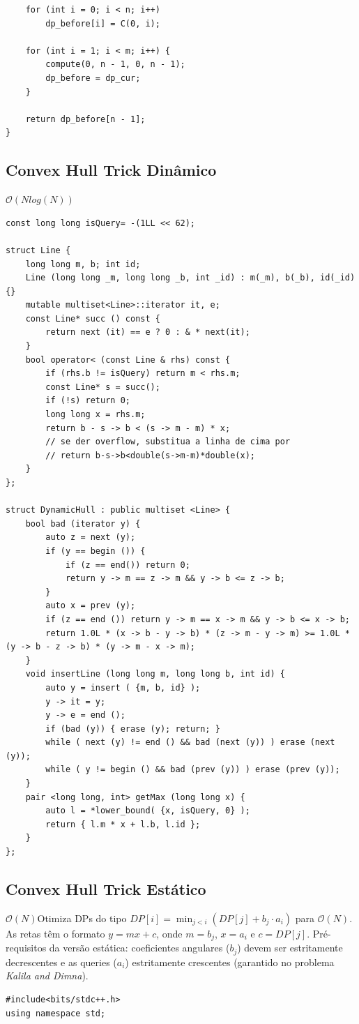\documentclass[11pt]{article}
\begin{document}
\begin{multicols}{2}
\begin{lstlisting}
    for (int i = 0; i < n; i++)
        dp_before[i] = C(0, i);

    for (int i = 1; i < m; i++) {
        compute(0, n - 1, 0, n - 1);
        dp_before = dp_cur;
    }

    return dp_before[n - 1];
}
\end{lstlisting}

\subsection{Convex Hull Trick Dinâmico}
$\mathcal{O}(Nlog(N))$
\begin{lstlisting}
const long long isQuery= -(1LL << 62);

struct Line {
	long long m, b; int id;
	Line (long long _m, long long _b, int _id) : m(_m), b(_b), id(_id) {}
	mutable multiset<Line>::iterator it, e;
	const Line* succ () const {
		return next (it) == e ? 0 : & * next(it);
	}
	bool operator< (const Line & rhs) const {
		if (rhs.b != isQuery) return m < rhs.m;
		const Line* s = succ();
		if (!s) return 0;
		long long x = rhs.m;
		return b - s -> b < (s -> m - m) * x;
		// se der overflow, substitua a linha de cima por
		// return b-s->b<double(s->m-m)*double(x);
	}
};

struct DynamicHull : public multiset <Line> {
	bool bad (iterator y) {
		auto z = next (y);
		if (y == begin ()) {
			if (z == end()) return 0;
			return y -> m == z -> m && y -> b <= z -> b;
		}
		auto x = prev (y);
		if (z == end ()) return y -> m == x -> m && y -> b <= x -> b;
		return 1.0L * (x -> b - y -> b) * (z -> m - y -> m) >= 1.0L * (y -> b - z -> b) * (y -> m - x -> m);
	}
	void insertLine (long long m, long long b, int id) {
		auto y = insert ( {m, b, id} );
		y -> it = y;
		y -> e = end ();
		if (bad (y)) { erase (y); return; }
		while ( next (y) != end () && bad (next (y)) ) erase (next (y));
		while ( y != begin () && bad (prev (y)) ) erase (prev (y));
	}
	pair <long long, int> getMax (long long x) {
		auto l = *lower_bound( {x, isQuery, 0} );
		return { l.m * x + l.b, l.id };
	}
};
\end{lstlisting}

\subsection{Convex Hull Trick Estático}
$\mathcal{O}(N)$Otimiza DPs do tipo $DP[i] = \min_{j < i}(DP[j] + b_j \cdot a_i)$ para $\mathcal{O}(N)$. As retas têm o formato $y = mx + c$, onde $m = b_j$, $x = a_i$ e $c = DP[j]$. Pré-requisitos da versão estática: coeficientes angulares ($b_j$) devem ser estritamente decrescentes e as queries ($a_i$) estritamente crescentes (garantido no problema \textit{Kalila and Dimna}).
\begin{lstlisting}
#include<bits/stdc++.h>
using namespace std;


\end{lstlisting}
\end{multicols}
\end{document}
